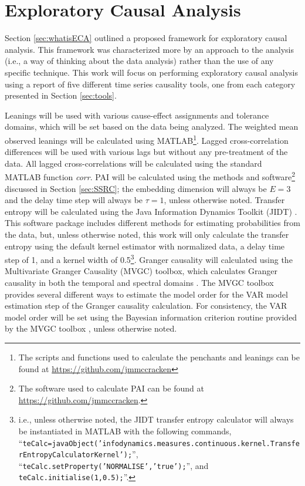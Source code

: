 \chapter{Exploratory Causal Analysis}
\label{sec:ECA}
Section \ref{sec:whatisECA} outlined a proposed framework for exploratory causal analysis.  This framework was characterized more by an approach to the analysis (i.e., a way of thinking about the data analysis) rather than the use of any specific technique.  This work will focus on performing exploratory causal analysis using a report of five different time series causality tools, one from each category presented in Section \ref{sec:tools}. 

Leanings will be used with various cause-effect assignments and tolerance domains, which will be set based on the data being analyzed.  The weighted mean observed leanings will be calculated using {\sc MATLAB}\footnote{The scripts and functions used to calculate the penchants and leanings can be found at \url{https://github.com/jmmccracken}}.  Lagged cross-correlation differences will be used with various lags but without any pre-treatment of the data.  All lagged cross-correlations will be calculated using the standard {\sc MATLAB} function {\em corr}.  PAI will be calculated using the methods and software\footnote{The software used to calculate PAI can be found at \url{https://github.com/jmmccracken}.} discussed in Section \ref{sec:SSRC}; the embedding dimension will always be $E=3$ and the delay time step will always be $\tau=1$, unless otherwise noted.  Transfer entropy will be calculated using the Java Information Dynamics Toolkit (JIDT) \cite{Lizier2014}.  This software package includes different methods for estimating probabilities from the data, but, unless otherwise noted, this work will only calculate the transfer entropy using the default kernel estimator with normalized data, a delay time step of 1, and a kernel width of 0.5\footnote{i.e., unless otherwise noted, the JIDT transfer entropy calculator will always be instantiated in {\sc MATLAB} with the following commands, ``{\tt teCalc=javaObject('infodynamics.measures.continuous.kernel.TransferEntropyCalculatorKernel');}'', ``{\tt teCalc.setProperty('NORMALISE','true');}'', and {\tt teCalc.initialise(1,0.5);}''.}.  Granger causality will calculated using the Multivariate Granger Causality (MVGC) toolbox, which calculates Granger causality in both the temporal and spectral domains \cite{Barnett2015}.  The MVGC toolbox provides several different ways to estimate the model order for the VAR model estimation step of the Granger causality calculation.  For consistency, the VAR model order will be set using the Bayesian information criterion \cite{Box2013,Weakliem1999} routine provided by the MVGC toolbox \cite{Barnett2015}, unless otherwise noted.

